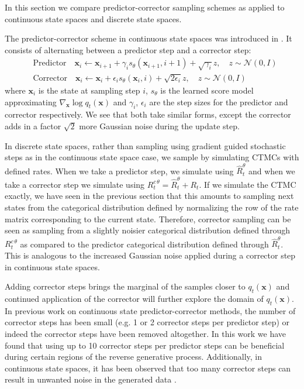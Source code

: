 \documentclass{article}
\begin{document}
In this section we compare predictor-corrector sampling schemes as applied to continuous state spaces and discrete state spaces.

The predictor-corrector scheme in continuous state spaces was introduced in \cite{song2020score}. It consists of alternating between a predictor step and a corrector step:
\begin{align}
    &\text{Predictor} \quad \bm{x}_i \leftarrow \bm{x}_{i+1} + \gamma_i s_\theta(\bm{x}_{i+1}, i+1) + \sqrt{\gamma_i} z, \quad z \sim \mathcal{N}(0, I)\\
    &\text{Corrector} \quad \bm{x}_i \leftarrow \bm{x}_{i} + \epsilon_i s_\theta(\bm{x}_i, i) + \sqrt{2 \epsilon_i} z, \quad z \sim \mathcal{N}(0, I)
\end{align}
where $\bm{x}_i$ is the state at sampling step $i$, $s_\theta$ is the learned score model approximating $\nabla_{\bm{x}} \log q_t(\bm{x})$ and $\gamma_i$, $\epsilon_i$ are the step sizes for the predictor and corrector respectively. We see that both take similar forms, except the corrector adds in a factor $\sqrt{2}$ more Gaussian noise during the update step.

In discrete state spaces, rather than sampling using gradient guided stochastic steps as in the continuous state space case, we sample by simulating CTMCs with defined rates. When we take a predictor step, we simulate using $\hat{R}_t^\theta$ and when we take a corrector step we simulate using $R_t^{c \, \theta} = \hat{R}_t^\theta + R_t$. If we simulate the CTMC exactly, we have seen in the previous section that this amounts to sampling next states from the categorical distribution defined by normalizing the row of the rate matrix corresponding to the current state. Therefore, corrector sampling can be seen as sampling from a slightly noisier categorical distribution defined through $R_t^{c \, \theta}$ as compared to the predictor categorical distribution defined through $\hat{R}_t^\theta$. This is analogous to the increased Gaussian noise applied during a corrector step in continuous state spaces.

Adding corrector steps brings the marginal of the samples closer to $q_t(\bm{x})$ and continued application of the corrector will further explore the domain of $q_t(\bm{x})$. In previous work on continuous state predictor-corrector methods, the number of corrector steps has been small (e.g. 1 or 2 corrector steps per predictor step) or indeed the corrector steps have been removed altogether. In this work we have found that using up to 10 corrector steps per predictor steps can be beneficial during certain regions of the reverse generative process. Additionally, in continuous state spaces, it has been observed that too many corrector steps can result in unwanted noise in the generated data \cite{furusawa2021generative}.
\end{document}
